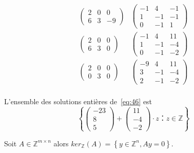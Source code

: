 \begin{example}
\begin{equation}
\begin{array}{cc}
\left(\begin{matrix}2 & 0 & 0\\6 & 3 & -9\end{matrix}\right) &
\left(\begin{matrix}-1 & 4 & -1\\1 & -1 & -1\\0 & -1 & 1\end{matrix}\right)\\

\left(\begin{matrix}2 & 0 & 0\\6 & 3 & 0\end{matrix}\right) &
\left(\begin{matrix}-1 & 4 & 11\\1 & -1 & -4\\0 & -1 & -2\end{matrix}\right)\\


\left(\begin{matrix}2 & 0 & 0\\0 & 3 & 0\end{matrix}\right) &
\left(\begin{matrix}-9 & 4 & 11\\3 & -1 & -4\\2 & -1 & -2\end{matrix}\right)\\
      \end{array}      
    \end{equation}

    L'ensemble des  solutions entières de~\eqref{eq:46} est 
    \begin{displaymath}
      \left\{ \left(\begin{matrix}-23\\8\\5\end{matrix}\right) + \left(\begin{matrix}11\\-4\\-2\end{matrix}\right) ⋅z ： z ∈ℤ\right\}
    \end{displaymath}
    
  \end{example}
  
  \begin{definition}
   \label{def:49}
   Soit $A \in \mathbb{Z}^{m \times n}$ alors $ker_{\mathbb{Z}}(A) = \left\{ y \in \mathbb{Z}^n, Ay=0 \right\}  $.
  \end{definition}
  
